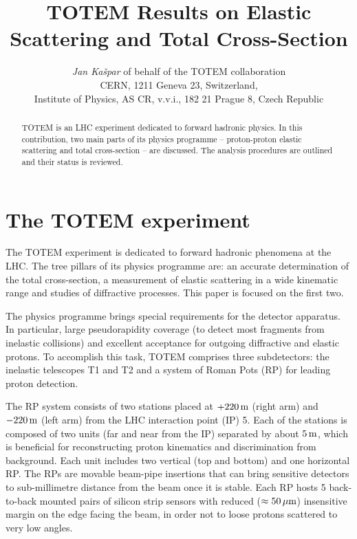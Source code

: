 \documentclass{desyproc}
\def\un#1{\,{\rm #1}}
\begin{document}
\title{TOTEM Results on Elastic Scattering and Total Cross-Section}

\author{{\slshape Jan Ka\v spar} of behalf of the TOTEM collaboration\\[1ex]
CERN, 1211 Geneva 23, Switzerland,\\
Institute of Physics, AS CR, v.v.i., 182 21 Prague 8, Czech Republic
}

 

\maketitle

\begin{abstract}
TOTEM is an LHC experiment dedicated to forward hadronic physics. In this contribution, two main parts of its physics programme -- proton-proton elastic scattering and total cross-section -- are discussed. The analysis procedures are outlined and their status is reviewed.
\end{abstract}

\section{The TOTEM experiment}

The TOTEM experiment \cite{totem_jinst} is dedicated to forward hadronic phenomena at the LHC. The tree pillars of its physics programme are: an accurate determination of the total cross-section, a measurement of elastic scattering in a wide kinematic range and studies of diffractive processes. This paper is focused on the first two. 

The physics programme brings special requirements for the detector apparatus. In particular, large pseudorapidity coverage (to detect most fragments from inelastic collisions) and excellent acceptance for outgoing diffractive and elastic protons. To accomplish this task, TOTEM comprises three subdetectors: the inelastic telescopes T1 and T2 and a system of Roman Pots (RP) for leading proton detection.

The RP system consists of two stations placed at $+220\un{m}$ (right arm) and $-220\un{m}$ (left arm) from the LHC interaction point (IP) 5. Each of the stations is composed of two units (far and near from the IP) separated by about $5\un{m}$, which is beneficial for reconstructing proton kinematics and discrimination from background. Each unit includes two vertical (top and bottom) and one horizontal RP. The RPs are movable beam-pipe insertions that can bring sensitive detectors to sub-millimetre distance from the beam once it is stable. Each RP hosts 5 back-to-back mounted pairs of silicon strip sensors with reduced ($\approx 50\un{\mu m}$) insensitive margin on the edge facing the beam, in order not to loose protons scattered to very low angles.
\end{document}
